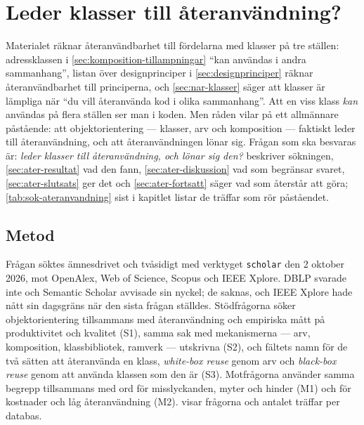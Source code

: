 \chapter{Leder klasser till återanvändning?}
\label{app:ateranvandning}

Materialet räknar återanvändbarhet till fördelarna med klasser på tre
ställen: adressklassen i \cref{sec:komposition-tillampningar}
\enquote{kan användas i andra sammanhang}, listan över designprinciper i
\cref{sec:designprinciper} räknar återanvändbarhet till principerna,
och \cref{sec:nar-klasser} säger att klasser är
lämpliga när \enquote{du vill återanvända kod i olika sammanhang}.  Att
en viss klass \emph{kan} användas på flera ställen ser man i koden.  Men
råden vilar på ett allmännare påstående: att objektorientering ---
klasser, arv och komposition --- faktiskt leder till återanvändning, och
att återanvändningen lönar sig.  Frågan som ska besvaras är: \emph{leder
klasser till återanvändning, och lönar sig den?}  
beskriver sökningen, \cref{sec:ater-resultat} vad den fann,
\cref{sec:ater-diskussion} vad som begränsar svaret,
\cref{sec:ater-slutsats} ger det och \cref{sec:ater-fortsatt} säger vad
som återstår att göra; \cref{tab:sok-ateranvandning} sist i kapitlet
listar de träffar som rör påståendet.

\section{Metod}
\label{sec:ater-metod}

Frågan söktes ämnesdrivet och tvåsidigt med verktyget \texttt{scholar}
den 2 oktober 2026, mot OpenAlex, Web of Science, Scopus och IEEE Xplore.
DBLP svarade inte och Semantic Scholar avvisade sin nyckel; de saknas, och
IEEE Xplore hade nått sin dagsgräns när den sista frågan ställdes.
Stödfrågorna söker objektorientering tillsammans med återanvändning och
empiriska mått på produktivitet och kvalitet (S1), samma sak med
mekanismerna --- arv, komposition, klassbibliotek, ramverk --- utskrivna
(S2), och fältets namn för de två sätten att återanvända en klass,
\emph{white-box reuse} genom arv och \emph{black-box reuse} genom att
använda klassen som den är (S3).  Motfrågorna använder samma begrepp
tillsammans med ord för misslyckanden, myter och hinder (M1) och för
kostnader och låg återanvändning (M2).  
visar frågorna och antalet träffar per databas.


